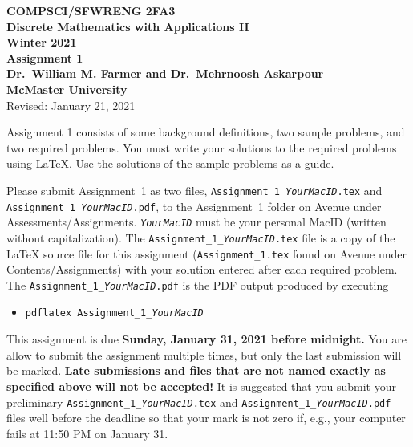 \documentclass[11pt,fleqn]{article}
\begin{document}
\begin{center}

  {\large \textbf{COMPSCI/SFWRENG 2FA3}}\\[2mm]
  {\large \textbf{Discrete Mathematics with Applications II}}\\[2mm]
  {\large \textbf{Winter 2021}}\\[8mm]
  {\huge \textbf{Assignment 1}}\\[6mm]
  {\large \textbf{Dr.~William M. Farmer and Dr.~Mehrnoosh Askarpour}}\\[2mm]
  {\large \textbf{McMaster University}}\\[6mm]
  {\large Revised: January 21, 2021}

\end{center}

\medskip

Assignment 1 consists of some background definitions, two sample
problems, and two required problems.  You must write your solutions to
the required problems using LaTeX.  Use the solutions of the sample
problems as a guide.

Please submit Assignment~1 as two files,
\texttt{Assignment\_1\_\emph{YourMacID}.tex} and
\texttt{Assignment\_1\_\emph{YourMacID}.pdf}, to the Assignment~1
folder on Avenue under Assessments/Assignments.
\texttt{\emph{YourMacID}} must be your personal MacID (written without
capitalization).  The \texttt{Assignment\_1\_\emph{YourMacID}.tex}
file is a copy of the LaTeX source file for this assignment
(\texttt{Assignment\_1.tex} found on Avenue under
Contents/Assignments) with your solution entered after each required
problem.  The \texttt{Assignment\_1\_\emph{YourMacID}.pdf} is the PDF
output produced by executing

\begin{itemize}

  \item[] \texttt{pdflatex Assignment\_1\_\emph{YourMacID}}

\end{itemize}

This assignment is due \textbf{Sunday, January 31, 2021 before
  midnight.}  You are allow to submit the assignment multiple times,
but only the last submission will be marked.  \textbf{Late submissions
  and files that are not named exactly as specified above will not be
  accepted!}  It is suggested that you submit your preliminary
\texttt{Assignment\_1\_\emph{YourMacID}.tex} and
\texttt{Assignment\_1\_\emph{YourMacID}.pdf} files well before the
deadline so that your mark is not zero if, e.g., your computer fails
at 11:50 PM on January 31.
\end{document}
